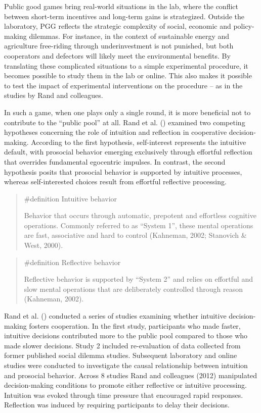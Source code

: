\documentclass[
  letterpaper,
]{book}
\begin{document}
Public good games bring real-world situations in the lab, where the
conflict between short-term incentives and long-term gains is
strategized. Outside the laboratory, PGG reflects the strategic
complexity of social, economic and policy-making dilemmas. For instance,
in the context of sustainable energy and agriculture free-riding through
underinvestment is not punished, but both cooperators and defectors will
likely meet the environmental benefits. By translating these complicated
situations to a simple experimental procedure, it becomes possible to
study them in the lab or online. This also makes it possible to test the
impact of experimental interventions on the procedure -- as in the
studies by Rand and colleagues.

In such a game, when one plays only a single round, it is more
beneficial not to contribute to the ``public pool'' at all. Rand et al.
() examined two competing
hypotheses concerning the role of intuition and reflection in
cooperative decision-making. According to the first hypothesis,
self-interest represents the intuitive default, with prosocial behavior
emerging exclusively through effortful reflection that overrides
fundamental egocentric impulses. In contrast, the second hypothesis
posits that prosocial behavior is supported by intuitive processes,
whereas self-interested choices result from effortful reflective
processing.

\begin{quote}
\label{def-pgg}{\#definition} Intuitive behavior

Behavior that occurs through automatic, prepotent and effortless
cognitive operations. Commonly referred to as ``System 1'', these mental
operations are fast, associative and hard to control (Kahneman, 2002;
Stanovich \& West, 2000).
\end{quote}

\begin{quote}
\label{def-pgg}{\#definition} Reflective behavior

Reflective behavior is supported by ``System 2'' and relies on effortful
and slow mental operations that are deliberately controlled through
reason (Kahneman, 2002).
\end{quote}

Rand et al. () conducted a
series of studies examining whether intuitive decision-making fosters
cooperation. In the first study, participants who made faster, intuitive
decisions contributed more to the public pool compared to those who made
slower decisions. Study 2 included re-evaluation of data collected from
former published social dilemma studies. Subsequent laboratory and
online studies were conducted to investigate the causal relationship
between intuition and prosocial behavior. Across 8 studies Rand and
colleagues (2012) manipulated decision-making conditions to promote
either reflective or intuitive processing. Intuition was evoked through
time pressure that encouraged rapid responses. Reflection was induced by
requiring participants to delay their decisions.
\end{document}
